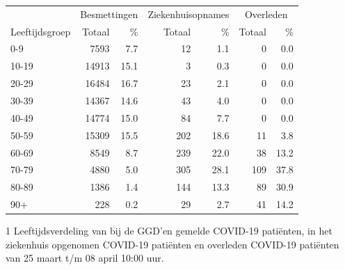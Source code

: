 \documentclass[
  english,
  man,floatsintext]{apa6}
\begin{document}
\begin{table}
\centering\begingroup\fontsize{11}{13}\selectfont

\begin{threeparttable}
\begin{tabular}{lrrrrrr}
\toprule
\multicolumn{1}{c}{ } & \multicolumn{2}{c}{Besmettingen} & \multicolumn{2}{c}{Ziekenhuisopnames} & \multicolumn{2}{c}{Overleden} \\
\cmidrule(l{3pt}r{3pt}){2-3} \cmidrule(l{3pt}r{3pt}){4-5} \cmidrule(l{3pt}r{3pt}){6-7}
Leeftijdsgroep & Totaal & \% & Totaal & \% & Totaal & \%\\
\midrule
0-9 & 7593 & 7.7 & 12 & 1.1 & 0 & 0.0\\
10-19 & 14913 & 15.1 & 3 & 0.3 & 0 & 0.0\\
20-29 & 16484 & 16.7 & 23 & 2.1 & 0 & 0.0\\
30-39 & 14367 & 14.6 & 43 & 4.0 & 0 & 0.0\\
40-49 & 14774 & 15.0 & 84 & 7.7 & 0 & 0.0\\
50-59 & 15309 & 15.5 & 202 & 18.6 & 11 & 3.8\\
60-69 & 8549 & 8.7 & 239 & 22.0 & 38 & 13.2\\
70-79 & 4880 & 5.0 & 305 & 28.1 & 109 & 37.8\\
80-89 & 1386 & 1.4 & 144 & 13.3 & 89 & 30.9\\
90+ & 228 & 0.2 & 29 & 2.7 & 41 & 14.2\\
\bottomrule
\end{tabular}
\begin{tablenotes}
\item[1] Leeftijdsverdeling van bij de GGD’en gemelde COVID-19 patiënten, in het ziekenhuis opgenomen COVID-19 patiënten en overleden COVID-19 patiënten van 25 maart t/m 08 april 10:00 uur.
\end{tablenotes}
\end{threeparttable}
\endgroup{}
\end{table}

\newpage
\end{document}

